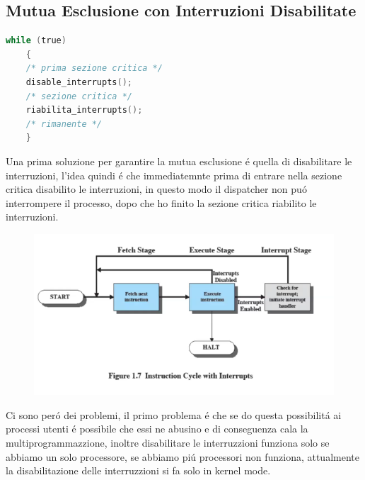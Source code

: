 \subsection*{Mutua Esclusione con Interruzioni Disabilitate}
\begin{lstlisting}[language=C]
    while (true)
    {
    /* prima sezione critica */
    disable_interrupts();
    /* sezione critica */
    riabilita_interrupts();
    /* rimanente */
    }
\end{lstlisting}
Una prima soluzione per garantire la mutua esclusione é quella di disabilitare le interruzioni, l'idea quindi é che immediatemnte
prima di entrare nella sezione critica disabilito le interruzioni, in questo modo il dispatcher non puó interrompere il processo, dopo che ho finito la sezione critica
riabilito le interruzioni.
\begin{figure}[H]
    \centering
    \includegraphics[width=0.5\linewidth]{immagini/DisibilitazioneInterruzzioniMutuaEsclusione}
\end{figure}
Ci sono peró dei problemi, il primo problema é che se do questa possibilitá ai processi utenti é possibile che essi ne
abusino e di conseguenza cala la multiprogrammazzione, inoltre disabilitare le interruzzioni funziona solo se abbiamo un
solo processore, se abbiamo piú processori non funziona, attualmente la disabilitazione delle interruzzioni si fa solo
in kernel mode.
